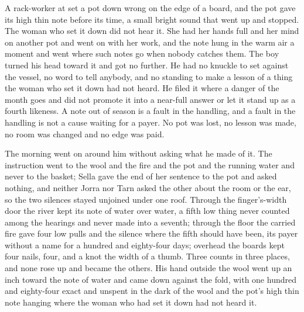 A rack-worker at  set a pot down wrong on the edge of a board, and the pot gave its high thin note before its time, a small bright sound that went up and stopped. The woman who set it down did not hear it. She had her hands full and her mind on another pot and went on with her work, and the note hung in the warm air a moment and went where such notes go when nobody catches them. The boy turned his head toward it and got no further. He had no knuckle to set against the vessel, no word to tell anybody, and no standing to make a lesson of a thing the woman who set it down had not heard. He filed it where a danger of the month goes and did not promote it into a near-full answer or let it stand up as a fourth likeness. A note out of season is a fault in the handling, and a fault in the handling is not a cause waiting for a payer. No pot was lost, no lesson was made, no room was changed and no edge was paid.

The morning went on around him without asking what he made of it. The instruction went to the wool and the fire and the pot and the running water and never to the basket; Sella gave the end of her sentence to the pot and asked nothing, and neither Jorra nor Tarn asked the other about the room or the ear, so the two silences stayed unjoined under one roof. Through the finger's-width door the river kept its note of water over water, a fifth low thing never counted among the hearings and never made into a seventh; through the floor the carried fire gave four low pulls and the silence where the fifth should have been, its payer without a name for a hundred and eighty-four days; overhead the boards kept four nails, four, and a knot the width of a thumb. Three counts in three places, and none rose up and became the others. His hand outside the wool went up an inch toward the note of water and came down against the fold, with one hundred and eighty-four exact and unspent in the dark of the wool and the pot's high thin note hanging where the woman who had set it down had not heard it.
